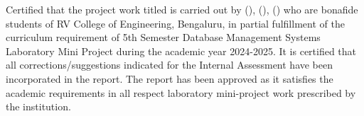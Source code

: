 \begin{spacing}{1.5}


Certified that the project work titled {\textbf{\textit{\printTitle}}} is carried out by {\textbf{\printStuNameA } (\textbf{\printStuUSNA}), \textbf{\printStuNameB } (\textbf{\printStuUSNB})}, {\textbf{\printStuNameC } (\textbf{\printStuUSNC})} who are bonafide students of RV College of Engineering, Bengaluru, in
partial fulfillment of the curriculum requirement of 5th Semester Database Management Systems Laboratory Mini Project during the academic year 2024-2025. It is certified that all corrections/suggestions indicated for the Internal Assessment have been incorporated in the report. The report has been approved as it satisfies the academic requirements in all respect laboratory mini-project work
prescribed by the institution.

\end{spacing}





